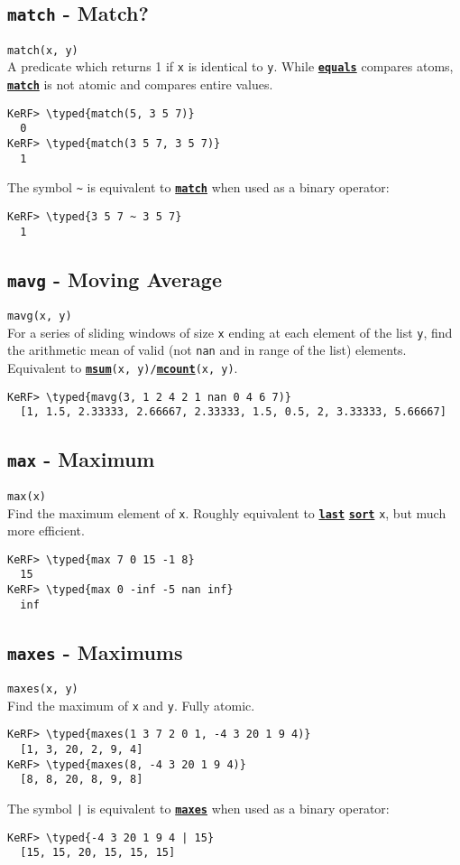 \documentclass{article}
\newcommand{\typed}[1]{\textcolor{TealBlue}{#1}}
\newcommand{\primdefu}[3]{\subsection{\texttt{#1} - #2}\label{prim:#3}}
\newcommand{\primu}[2]{\hyperref[prim:#2]{\textbf{\texttt{#1}}}}
\newcommand{\primdef}[2]{\primdefu{#1}{#2}{#1}}
\newcommand{\prim}[1]{\primu{#1}{#1}}
\begin{document}
\primdef{match}{Match?}
\texttt{match(x, y)}\\

A predicate which returns 1 if \texttt{x} is identical to \texttt{y}. While \prim{equals} compares atoms, \prim{match} is not atomic and compares entire values.
\begin{Verbatim}
KeRF> \typed{match(5, 3 5 7)}
  0
KeRF> \typed{match(3 5 7, 3 5 7)}
  1
\end{Verbatim}

The symbol \texttt{\textasciitilde} is equivalent to \prim{match} when used as a binary operator:
\begin{Verbatim}
KeRF> \typed{3 5 7 ~ 3 5 7}
  1
\end{Verbatim}

\primdef{mavg}{Moving Average}
\texttt{mavg(x, y)}\\

For a series of sliding windows of size \texttt{x} ending at each element of the list \texttt{y}, find the arithmetic mean of valid (not \texttt{nan} and in range of the list) elements. Equivalent to \texttt{\prim{msum}(x, y)/\prim{mcount}(x, y)}.
\begin{Verbatim}
KeRF> \typed{mavg(3, 1 2 4 2 1 nan 0 4 6 7)}
  [1, 1.5, 2.33333, 2.66667, 2.33333, 1.5, 0.5, 2, 3.33333, 5.66667]
\end{Verbatim}

\primdef{max}{Maximum}
\texttt{max(x)}\\

Find the maximum element of \texttt{x}. Roughly equivalent to \prim{last} \prim{sort} \texttt{x}, but much more efficient.
\begin{Verbatim}
KeRF> \typed{max 7 0 15 -1 8}
  15
KeRF> \typed{max 0 -inf -5 nan inf}
  inf
\end{Verbatim}

\primdef{maxes}{Maximums}
\texttt{maxes(x, y)}\\

Find the maximum of \texttt{x} and \texttt{y}. Fully atomic.
\begin{Verbatim}
KeRF> \typed{maxes(1 3 7 2 0 1, -4 3 20 1 9 4)}
  [1, 3, 20, 2, 9, 4]
KeRF> \typed{maxes(8, -4 3 20 1 9 4)}
  [8, 8, 20, 8, 9, 8]
\end{Verbatim}

The symbol \texttt{|} is equivalent to \prim{maxes} when used as a binary operator:
\begin{Verbatim}
KeRF> \typed{-4 3 20 1 9 4 | 15}
  [15, 15, 20, 15, 15, 15]
\end{Verbatim}
\end{document}
